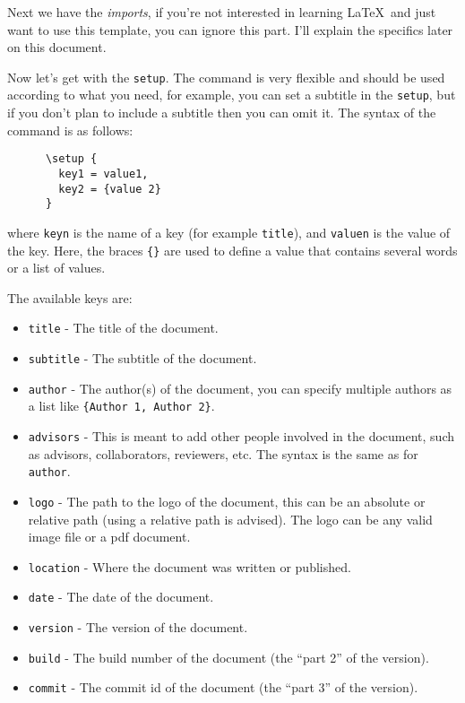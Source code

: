     Next we have the \textit{imports}, if you're not interested in learning \LaTeX~and just want to
    use this template, you can ignore this part.
    I'll explain the specifics later on this document.

    Now let's get with the \texttt{setup}.
    The command is very flexible and should be used according to what you need, for example, you can
    set a subtitle in the \texttt{setup}, but if you don't plan to include a subtitle then you can 
    omit it.
    The syntax of the command is as follows:
    \begin{verbatim}
      \setup { 
        key1 = value1,
        key2 = {value 2}
      }
    \end{verbatim}
    where \texttt{keyn} is the name of a key (for example \texttt{title}), and \texttt{valuen} is the
    value of the key.
    Here, the braces \texttt{\{\}} are used to define a value that contains several words or a list
    of values.

    The available keys are:
    \begin{itemize}
      \item \texttt{title} - The title of the document.
      \item \texttt{subtitle} - The subtitle of the document.
      \item \texttt{author} - The author(s) of the document, you can specify multiple authors as a 
        list like \texttt{\{Author 1, Author 2\}}.
      \item \texttt{advisors} - This is meant to add other people involved in the document, such as 
        advisors, collaborators, reviewers, etc.
        The syntax is the same as for \texttt{author}.
      \item \texttt{logo} - The path to the logo of the document, this can be an absolute or 
        relative path (using a relative path is advised).
        The logo can be any valid image file or a pdf document.
      \item \texttt{location} - Where the document was written or published.
      \item \texttt{date} - The date of the document.
      \item \texttt{version} - The version of the document.
      \item \texttt{build} - The build number of the document (the \enquote{part 2} of the version).
      \item \texttt{commit} - The commit id of the document (the \enquote{part 3} of the version).
    \end{itemize}


